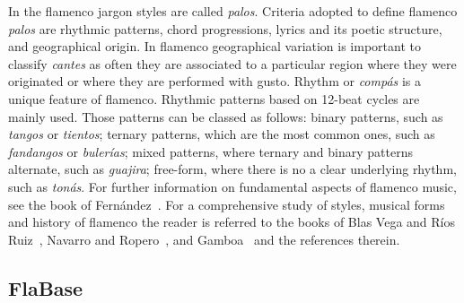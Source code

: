 
In the flamenco jargon styles are called \textit{palos}. Criteria adopted to define flamenco \textit{palos} are rhythmic patterns, chord progressions, lyrics and its poetic structure, and geographical origin. In flamenco geographical variation is important to classify \textit{cantes} as often they are associated to a particular region where they were originated or where they are performed with gusto. 
Rhythm or \textit{comp\'as} is a unique feature of flamenco. %
Rhythmic patterns based on 12-beat cycles are mainly used. Those patterns can be classed as follows: binary patterns, such as \textit{tangos} or \textit{tientos}; ternary patterns, which are the most common ones, such as \textit{fandangos} or \textit{buler\'ias}; mixed patterns, where ternary and binary patterns alternate, such as \textit{guajira}; free-form, where there is no a clear underlying rhythm, such as \textit{ton\'as}.
For further information on fundamental aspects of flamenco music, see the book of Fern\'andez~\cite{fer-04}. For a comprehensive study of styles, musical forms and history of flamenco the reader is referred to the books of Blas Vega and R\'ios Ruiz~\cite{bvrr-88}, Navarro and Ropero~\cite{nr-95}, and Gamboa~\cite{gamboa-05} and the references therein.


\subsection{FlaBase}\label{sec:flabase}

